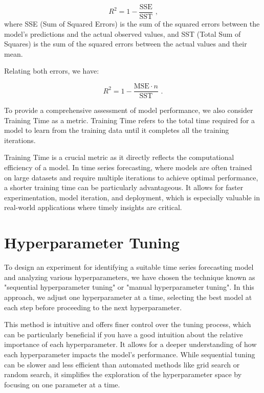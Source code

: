 \begin{equation}
R^2 = 1 - \frac{\text{SSE}}{\text{SST}}  \text{ ,}
\end{equation}where SSE (Sum of Squared Errors) is the sum of the squared errors between the model's predictions and the actual observed values, and SST (Total Sum of Squares) is the sum of the squared errors between the actual values and their mean.

Relating both errors, we have:

\begin{equation}
R^2 = 1 - \frac{\text{MSE} \cdot n}{\text{SST}}  \text{ .}
\end{equation}

To provide a comprehensive assessment of model performance, we also consider Training Time as a metric. Training Time refers to the total time required for a model to learn from the training data until it completes all the training iterations.

Training Time is a crucial metric as it directly reflects the computational efficiency of a model. In time series forecasting, where models are often trained on large datasets and require multiple iterations to achieve optimal performance, a shorter training time can be particularly advantageous. It allows for faster experimentation, model iteration, and deployment, which is especially valuable in real-world applications where timely insights are critical.

\section{Hyperparameter Tuning}

To design an experiment for identifying a suitable time series forecasting model and analyzing various hyperparameters, we have chosen the technique known as "sequential hyperparameter tuning" or "manual hyperparameter tuning". In this approach, we adjust one hyperparameter at a time, selecting the best model at each step before proceeding to the next hyperparameter.

This method is intuitive and offers finer control over the tuning process, which can be particularly beneficial if you have a good intuition about the relative importance of each hyperparameter. It allows for a deeper understanding of how each hyperparameter impacts the model's performance. While sequential tuning can be slower and less efficient than automated methods like grid search or random search, it simplifies the exploration of the hyperparameter space by focusing on one parameter at a time.

